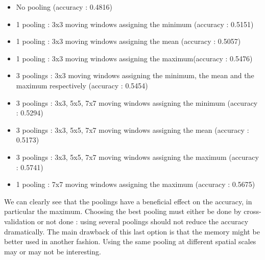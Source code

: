 \documentclass[a4paper]{report}
\begin{document}
	\begin{itemize}
		\item No pooling (accuracy : 0.4816)
		\item 1 pooling : 3x3 moving windows assigning the minimum (accuracy : 0.5151)
		\item 1 pooling : 3x3 moving windows assigning the mean (accuracy : 0.5057)
		\item 1 pooling : 3x3 moving windows assigning the maximum(accuracy : 0.5476)
		\item 3 poolings : 3x3 moving windows assigning the minimum, the mean and the maximum respectively (accuracy : 0.5454)
		\item 3 poolings : 3x3, 5x5, 7x7 moving windows assigning the minimum (accuracy : 0.5294)
		\item 3 poolings : 3x3, 5x5, 7x7 moving windows assigning the mean (accuracy : 0.5173)
		\item 3 poolings : 3x3, 5x5, 7x7 moving windows assigning the maximum (accuracy : 0.5741)
		\item 1 pooling : 7x7 moving windows assigning the maximum (accuracy : 0.5675)
	\end{itemize}
	We can clearly see that the poolings have a beneficial effect on the accuracy, in particular the maximum. %
	Choosing the best pooling must either be done by cross-validation or not done : using several poolings should not reduce the accuracy dramatically. The main drawback of this last option is that the memory might be better used in another fashion. Using the same pooling at different spatial scales may or may not be interesting.

	
\end{document}
